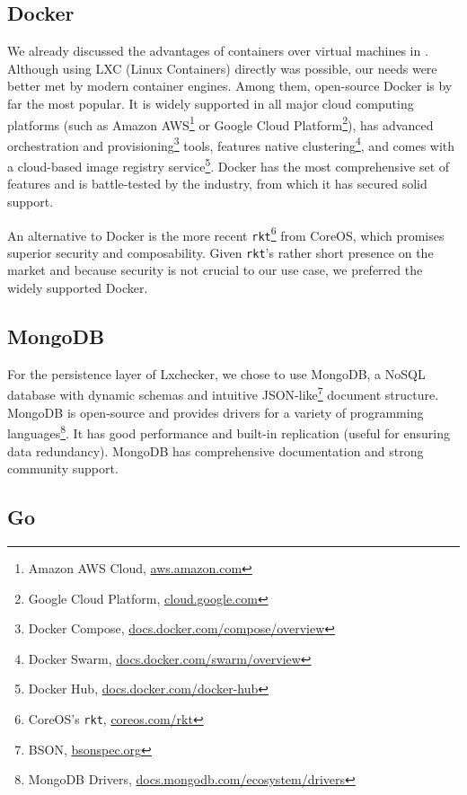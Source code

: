 \subsection{Docker}
\label{sec:tech-docker}

We already discussed the advantages of containers over virtual machines in . Although using LXC (Linux Containers) directly was possible, our needs were better met by modern container engines. Among them, open-source Docker is by far the most popular. It is widely supported in all major cloud computing platforms (such as Amazon AWS\footnote{Amazon AWS Cloud, \url{aws.amazon.com}} or Google Cloud Platform\footnote{Google Cloud Platform, \url{cloud.google.com}}), has advanced orchestration and provisioning\footnote{Docker Compose, \url{docs.docker.com/compose/overview}} tools, features native clustering\footnote{Docker Swarm, \url{docs.docker.com/swarm/overview}}, and comes with a cloud-based image registry service\footnote{Docker Hub, \url{docs.docker.com/docker-hub}}. Docker has the most comprehensive set of features and is battle-tested by the industry, from which it has secured solid support.

An alternative to Docker is the more recent \texttt{rkt}\footnote{CoreOS's \texttt{rkt}, \url{coreos.com/rkt}} from CoreOS, which promises superior security and composability. Given \texttt{rkt}'s rather short presence on the market and because security is not crucial to our use case, we preferred the widely supported Docker.

\subsection{MongoDB}
\label{sec:tech-mongo}

For the persistence layer of Lxchecker, we chose to use MongoDB, a NoSQL database with dynamic schemas and intuitive JSON-like\footnote{BSON, \url{bsonspec.org}} document structure. MongoDB is open-source and provides drivers for a variety of programming languages\footnote{MongoDB Drivers, \url{docs.mongodb.com/ecosystem/drivers}}. It has good performance\cite{erthalion} and built-in replication (useful for ensuring data redundancy). MongoDB has comprehensive documentation and strong community support.

\subsection{Go}
\label{sec:tech-go}

